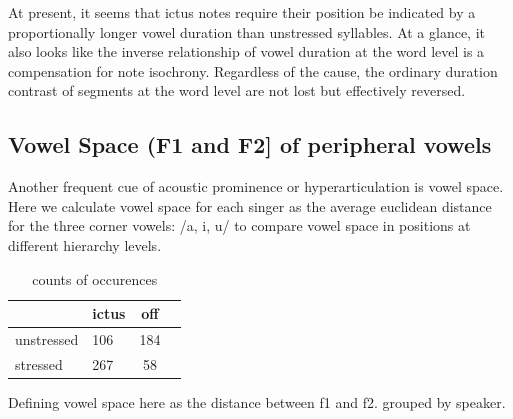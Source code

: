 \documentclass[12pt]{article}
\begin{document}
%   
%
%

At present, it seems that ictus notes require their position be indicated by a proportionally longer vowel duration than unstressed syllables. At a glance, it also looks like the inverse relationship of vowel duration at the word level is a compensation for note isochrony. Regardless of the cause, the ordinary duration contrast of segments at the word level are not lost but effectively reversed.
\subsection*{Vowel Space (F1 and F2] of peripheral vowels}
Another frequent cue of acoustic prominence or hyperarticulation is vowel space. Here we calculate vowel space for each singer as the average euclidean distance for the three corner vowels: /a, i, u/ to compare vowel space in positions at different hierarchy levels. 
\begin{table}[htp]
\caption{counts of occurences}
\begin{center}
\begin{tabular}{|llc|c|}
\hline
  & ictus  & off \\
  \hline
unstressed     &   106  & 184 \\
\hline
stressed    &  267  & 58 \\
\hline
\end{tabular}
\end{center}
\label{default}
\end{table}%
Defining vowel space here as the distance between f1 and f2. grouped by speaker. 
\end{document}
